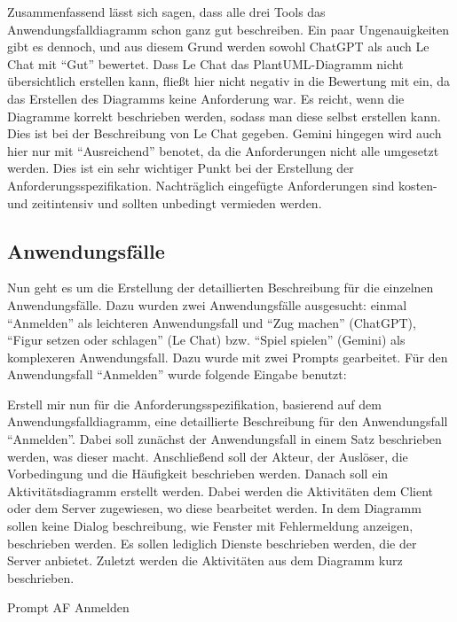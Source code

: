 Zusammenfassend lässt sich sagen, dass alle drei Tools das Anwendungsfalldiagramm schon ganz gut beschreiben. Ein paar Ungenauigkeiten gibt 
es dennoch, und aus diesem Grund werden sowohl ChatGPT als auch Le Chat mit ``Gut'' bewertet. Dass Le Chat das PlantUML-Diagramm nicht übersichtlich 
erstellen kann, fließt hier nicht negativ in die Bewertung mit ein, da das Erstellen des Diagramms keine Anforderung war. Es reicht, wenn die 
Diagramme korrekt beschrieben werden, sodass man diese selbst erstellen kann. Dies ist bei der Beschreibung von Le Chat gegeben. Gemini hingegen 
wird auch hier nur mit ``Ausreichend'' benotet, da die Anforderungen nicht alle umgesetzt werden. Dies ist ein sehr wichtiger Punkt bei der Erstellung 
der Anforderungsspezifikation. Nachträglich eingefügte Anforderungen sind kosten- und zeitintensiv und sollten unbedingt vermieden werden.

\subsection*{Anwendungsfälle}

Nun geht es um die Erstellung der detaillierten Beschreibung für die einzelnen Anwendungsfälle. Dazu wurden zwei Anwendungsfälle ausgesucht: 
einmal ``Anmelden'' als leichteren Anwendungsfall und ``Zug machen'' (ChatGPT), ``Figur setzen oder schlagen'' (Le Chat) bzw. ``Spiel spielen'' (Gemini) 
als komplexeren Anwendungsfall. Dazu wurde mit zwei Prompts gearbeitet. Für den Anwendungsfall ``Anmelden'' wurde folgende Eingabe benutzt:

\begin{prompt}[H]
    \begin{tcolorbox}[colback=gray!20, colframe=gray!20, boxrule=0pt, sharp corners] 
        Erstell mir nun für die Anforderungsspezifikation, basierend auf dem Anwendungsfalldiagramm, eine detaillierte Beschreibung für den Anwendungsfall ``Anmelden''. Dabei 
        soll zunächst der Anwendungsfall in einem Satz beschrieben werden, was dieser macht. Anschließend soll der Akteur, der Auslöser, die Vorbedingung und die Häufigkeit 
        beschrieben werden. Danach soll ein Aktivitätsdiagramm erstellt werden. Dabei werden die Aktivitäten dem Client oder dem Server zugewiesen, wo diese bearbeitet werden. 
        In dem Diagramm sollen keine Dialog beschreibung, wie Fenster mit Fehlermeldung anzeigen, beschrieben werden. Es sollen lediglich Dienste beschrieben werden, die der 
        Server anbietet. Zuletzt werden die Aktivitäten aus dem Diagramm kurz beschrieben.
        \vfill
    \end{tcolorbox}
    \caption{Prompt AF Anmelden}
    \label{Prompt AF Anmelden}
\end{prompt}

